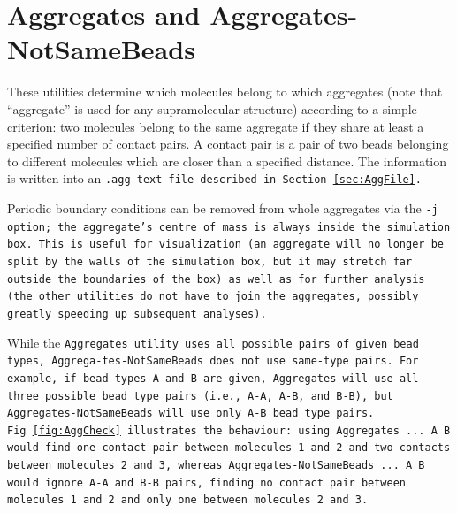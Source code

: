 \section{Aggregates and Aggregates-NotSameBeads} \label{sec:Aggregates}

These utilities determine which molecules belong to which aggregates (note that
\enquote{aggregate} is used for any supramolecular structure) according to a
simple criterion: two molecules belong to the same aggregate if they share at
least a specified number of contact pairs. A contact pair is a pair of two beads
belonging to different molecules which are closer than a specified distance. The
information is written into an \tt{.agg} text file described in
Section~\ref{sec:AggFile}.


Periodic boundary conditions can be removed from whole aggregates via the
\tt{-j} option; the aggregate's centre of mass is always inside the simulation
box. This is useful for visualization (an aggregate will no longer be split by
the walls of the simulation box, but it may stretch far outside the boundaries
of the box) as well as for further analysis (the other utilities do not have to
join the aggregates, possibly greatly speeding up subsequent analyses).

While the \tt{Aggregates} utility uses all possible pairs of given bead types,
\tt{Aggrega}-\tt{tes-NotSameBeads} does not use same-type pairs. For example, if
bead types \tt{A} and \tt{B} are given, \tt{Aggregates} will use all three
possible bead type pairs (i.e., \tt{A-A}, \tt{A-B}, and \tt{B-B}), but
\tt{Aggregates-NotSameBeads} will use only \tt{A-B} bead type pairs.
Fig~\ref{fig:AggCheck} illustrates the behaviour: using \tt{Aggregates ... A B}
would find one contact pair between molecules 1 and 2 and two contacts between
molecules 2 and 3, whereas \tt{Aggregates-NotSameBeads ... A B} would ignore A-A
and B-B pairs, finding no contact pair between molecules 1 and 2 and only one
between molecules 2 and 3.

